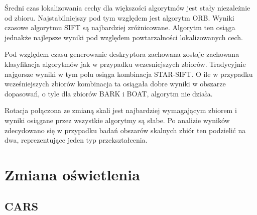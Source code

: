 Średni czas lokalizowania cechy dla większości algorytmów jest stały niezależnie od zbioru. Najstabilniejszy pod tym względem jest algorytm ORB. Wyniki czasowe algorytmu SIFT są najbardziej zróżnicowane. Algorytm ten osiąga jednakże najlepsze wyniki pod względem powtarzalności lokalizowanych cech.

Pod względem czasu generowanie deskryptora zachowana zostaje zachowana klasyfikacja algorytmów jak w przypadku wczesniejszych zbiorów. Tradycyjnie najgorsze wyniki w tym polu osiąga kombinacja STAR-SIFT. O ile w przypadku wcześniejszych zbiorów kombinacja ta osiągała dobre wyniki w obszarze dopasowań, o tyle dla zbiorów BARK i BOAT, algorytm nie działa.

Rotacja połączona ze zmianą skali jest najbardziej wymagającym zbiorem i wyniki osiągane przez wszystkie algorytmy są słabe. Po analizie wyników zdecydowano się w przypadku badań obszarów skalnych zbiór ten podzielić na dwa, reprezentujące jeden typ przekształcenia.



\FloatBarrier
\section{Zmiana oświetlenia}
\subsection{CARS}

